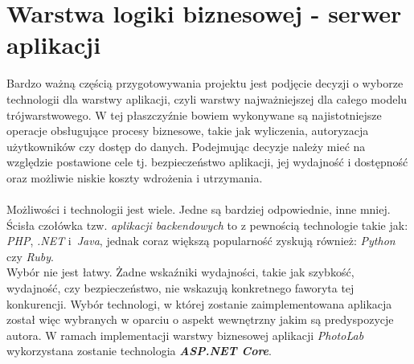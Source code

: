 \section{Warstwa logiki biznesowej - serwer aplikacji}

\quad Bardzo ważną częścią przygotowywania projektu jest podjęcie decyzji o wyborze technologii dla warstwy aplikacji, czyli warstwy najważniejszej dla całego modelu trójwarstwowego. W tej płaszczyźnie bowiem wykonywane są najistotniejsze operacje obsługujące procesy biznesowe, takie jak wyliczenia, autoryzacja użytkowników czy dostęp do danych. Podejmując decyzje należy mieć na względzie postawione cele tj. bezpieczeństwo aplikacji, jej wydajność i dostępność oraz możliwie niskie koszty wdrożenia i utrzymania. \\
\\
Możliwości i technologii jest wiele. Jedne są bardziej odpowiednie, inne mniej. Ścisła czołówka tzw. \textit{aplikacji backendowych} to z pewnością technologie takie jak: \textit{PHP}, \textit{.NET} i~\textit{Java}, jednak coraz większą popularność zyskują również: \textit{Python} czy \textit{Ruby}.\\
Wybór nie jest łatwy. Żadne wskaźniki wydajności, takie jak szybkość, wydajność, czy bezpieczeństwo, nie wskazują konkretnego faworyta tej konkurencji. Wybór technologi, w której zostanie zaimplementowana aplikacja został więc wybranych w oparciu o aspekt wewnętrzny jakim są predyspozycje autora. W ramach implementacji warstwy biznesowej aplikacji \textit{PhotoLab} wykorzystana zostanie technologia \textbf{\textit{ASP.NET Core}}.

